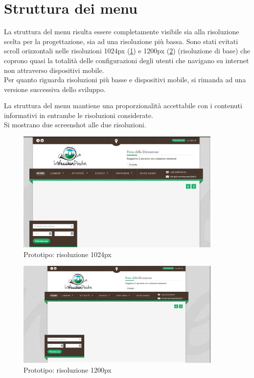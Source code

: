 \documentclass[a4paper,12pt,hidelinks]{report}
\begin{document}
\section*{Struttura dei menu}
La struttura del menu risulta essere completamente visibile sia alla risoluzione scelta per la progettazione, sia ad una risoluzione più bassa.
Sono stati evitati scroll orizzontali nelle risoluzioni 1024px (\ref{fig:nav1024}) e 1200px (\ref{fig:nav1200}) (risoluzione di base) che coprono quasi la totalità 
delle configurazioni degli utenti che navigano su internet non attraverso dispositivi mobile.
\\Per quanto riguarda risoluzioni più basse e dispositivi mobile, si rimanda ad una versione successiva dello sviluppo.
\par La struttura del menu mantiene una proporzionalità accettabile con i contenuti informativi in entrambe le risoluzioni considerate. 
\\Si mostrano due screenshot alle due risoluzioni.
\begin{figure}[h!]%
    \includegraphics[width=0.9\textwidth,keepaspectratio=true]{../img/nav1024}
    \centering
    \caption{Prototipo: risoluzione 1024px}%
    \label{fig:nav1024}%
\end{figure}

\begin{figure}[h!]%
    \includegraphics[width=0.9\textwidth,keepaspectratio=true]{../img/nav1200}
    \centering
    \caption{Prototipo: risoluzione 1200px}%
    \label{fig:nav1200}%
\end{figure}
\end{document}
